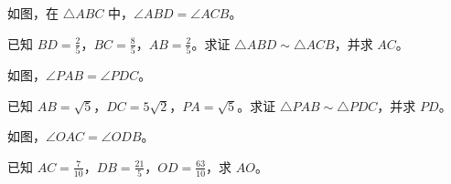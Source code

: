 \documentclass{exam-zh}
\begin{document}

\begin{problem}[points=10]
  \noindent
  \begin{minipage}[t]{\dimexpr\linewidth-60mm-6mm\relax}
    \vspace{0pt}
    如图，在 $\triangle ABC$ 中，$\angle ABD=\angle ACB$。

已知 $BD=\frac{2}{5}$，$BC=\frac{8}{5}$，$AB=\frac{2}{5}$。求证 $\triangle ABD\sim\triangle ACB$，并求 $AC$。
    
  \end{minipage}\hfill
  \begin{diagramcoltikz}{60mm}{先确认对应边，再判断题中的线段是否属于相似三角形。}
  }
  \end{diagramcoltikz}
  \par\medskip
  \answerarea[48mm]
\end{problem}



\begin{problem}[points=10]
  \noindent
  \begin{minipage}[t]{\dimexpr\linewidth-60mm-6mm\relax}
    \vspace{0pt}
    如图，$\angle PAB=\angle PDC$。

已知 $AB=\sqrt{5}$，$DC=5\sqrt{2}$，$PA=\sqrt{5}$。求证 $\triangle PAB\sim\triangle PDC$，并求 $PD$。
    
  \end{minipage}\hfill
  \begin{diagramcoltikz}{60mm}{沿题设等角的顶点顺序，找出两组三角形的对应边。}
  }
  \end{diagramcoltikz}
  \par\medskip
  \answerarea[48mm]
\end{problem}



\begin{problem}[points=10]
  \noindent
  \begin{minipage}[t]{\dimexpr\linewidth-60mm-6mm\relax}
    \vspace{0pt}
    如图，$\angle OAC=\angle ODB$。

已知 $AC=\frac{7}{10}$，$DB=\frac{21}{5}$，$OD=\frac{63}{10}$，求 $AO$。
    
  \end{minipage}\hfill
  \begin{diagramcoltikz}{60mm}{先用对顶角补齐第二组等角，再按顶点顺序配边。}
  }
  \end{diagramcoltikz}
  \par\medskip
  \answerarea[48mm]
\end{problem}
\end{document}

